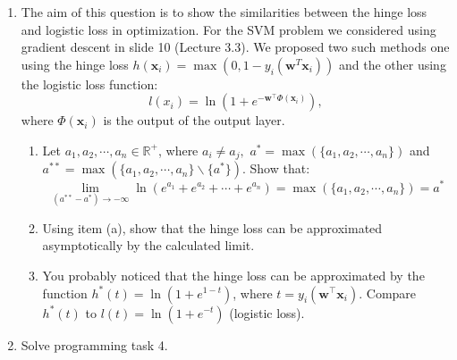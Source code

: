 \documentclass[]{scrartcl}
\newcommand{\R}{\mathbb{R}}
\newcommand{\bx}{\mathbf{x}}
\newcommand{\bw}{\mathbf{w}}
\begin{document}
\begin{enumerate}
\newpage
\item The aim of this question is to show the similarities between the hinge loss and logistic loss in optimization. For the SVM problem we considered using gradient descent in slide 10 (Lecture 3.3). We proposed two such methods one using the hinge loss $h(\bx_i)=\max{(0,1-y_i(\bw^T\bx_i))}$ and the other using the logistic loss function:
$$l(x_i) = \ln{(1+e^{-\bw^\top \Phi(\bx_i)})},$$
where $\Phi(\bx_i)$ is the output of the output layer.
\begin{enumerate}
    \item Let $a_1, a_2,\cdots,a_n \in \R^+$, where $a_i \neq a_j,$ $a^* = \max(\{a_1, a_2,\cdots,a_n\})$ and $a^{**} = \max(\{a_1, a_2,\cdots,a_n\} \backslash \{a^*\})$. Show that:
$$\lim_{(a^{**} - a^*)\to - \infty}{\ln{(e^{a_1}+e^{a_2} + \cdots + e^{a_n})}}= \max(\{a_1, a_2,\cdots,a_n\}) = a^*$$
\item Using item (a), show that the hinge loss can be approximated asymptotically by the calculated limit.
\item You probably noticed that the hinge loss can be approximated by the function $h^*(t) = \ln(1 + e^{1-t})$, where $t=y_i(\bw^\top \bx_i)$. Compare $h^*(t)$ to $l(t) = \ln (1 + e^{-t})$ (logistic loss).
\end{enumerate}

\item Solve programming task 4.
\end{enumerate}
\end{document}
